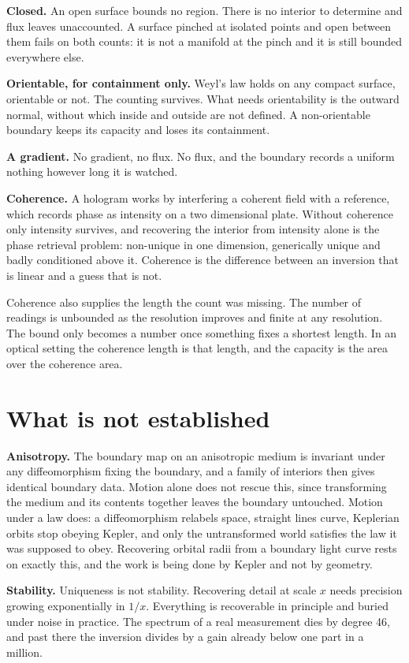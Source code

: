 \textbf{Closed.} An open surface bounds no region. There is no interior to determine and flux leaves unaccounted. A surface pinched at isolated points and open between them fails on both counts: it is not a manifold at the pinch and it is still bounded everywhere else.

\textbf{Orientable, for containment only.} Weyl's law holds on any compact surface, orientable or not. The counting survives. What needs orientability is the outward normal, without which inside and outside are not defined. A non-orientable boundary keeps its capacity and loses its containment.

\textbf{A gradient.} No gradient, no flux. No flux, and the boundary records a uniform nothing however long it is watched.

\textbf{Coherence.} A hologram works by interfering a coherent field with a reference, which records phase as intensity on a two dimensional plate. Without coherence only intensity survives, and recovering the interior from intensity alone is the phase retrieval problem: non-unique in one dimension, generically unique and badly conditioned above it. Coherence is the difference between an inversion that is linear and a guess that is not.

Coherence also supplies the length the count was missing. The number of readings is unbounded as the resolution improves and finite at any resolution. The bound only becomes a number once something fixes a shortest length. In an optical setting the coherence length is that length, and the capacity is the area over the coherence area.

\section{What is not established}

\textbf{Anisotropy.} The boundary map on an anisotropic medium is invariant under any diffeomorphism fixing the boundary, and a family of interiors then gives identical boundary data. Motion alone does not rescue this, since transforming the medium and its contents together leaves the boundary untouched. Motion under a law does: a diffeomorphism relabels space, straight lines curve, Keplerian orbits stop obeying Kepler, and only the untransformed world satisfies the law it was supposed to obey. Recovering orbital radii from a boundary light curve rests on exactly this, and the work is being done by Kepler and not by geometry.

\textbf{Stability.} Uniqueness is not stability. Recovering detail at scale $x$ needs precision growing exponentially in $1/x$. Everything is recoverable in principle and buried under noise in practice. The spectrum of a real measurement dies by degree 46, and past there the inversion divides by a gain already below one part in a million.

